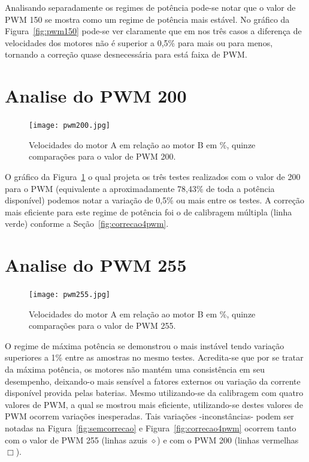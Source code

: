 \documentclass[a4paper,12pt,portuguese]{ufms-cpcx}
\begin{document}
Analisando separadamente os regimes de potência pode-se notar que o valor de PWM 150 se mostra como um regime de potência mais estável. No gráfico da Figura~\ref{fig:pwm150} pode-se ver claramente que em nos três casos a diferença de velocidades dos motores não é superior a 0,5\% para mais ou para menos, tornando a correção quase desnecessária para está faixa de PWM.

\section{Analise do PWM 200}\label{pwm200}
\begin{figure}[H]	
	\centering
	\texttt{[image: pwm200.jpg]}
	\caption{Velocidades do motor A em relação ao motor B em \%, quinze comparações para o valor de PWM 200.}
	\label{fig:pwm200}
\end{figure}
O gráfico da Figura~\ref{fig:pwm200} o qual projeta os três testes realizados com o valor de 200 para o PWM (equivalente a aproximadamente 78,43\% de toda a potência disponível) podemos notar a variação de 0,5\% ou mais entre os testes. A correção mais eficiente para este regime de potência foi o de calibragem múltipla (linha verde) conforme a Seção~\ref{fig:correcao4pwm}.

\section{Analise do PWM 255}\label{pwm255}
\begin{figure}[H]	
	\centering
	\texttt{[image: pwm255.jpg]}
	\caption{Velocidades do motor A em relação ao motor B em \%, quinze comparações para o valor de PWM 255.}
	\label{fig:pwm255}
\end{figure}

O regime de máxima potência se demonstrou o mais instável tendo variação superiores a 1\% entre as amostras no mesmo testes. Acredita-se que por se tratar da máxima potência, os motores não mantém uma consistência em seu desempenho, deixando-o mais sensível a fatores externos ou variação da corrente disponível provida pelas baterias.
Mesmo utilizando-se da calibragem com quatro valores de PWM, a qual se mostrou mais eficiente, utilizando-se destes valores de PWM ocorrem variações inesperadas. 
Tais variações -inconstâncias- podem ser notadas na Figura~\ref{fig:semcorrecao} e Figura~\ref{fig:correcao4pwm} ocorrem tanto com o valor de PWM 255 (linhas azuis $\diamond$) e com o PWM 200 (linhas vermelhas $\Box$).
\end{document}
